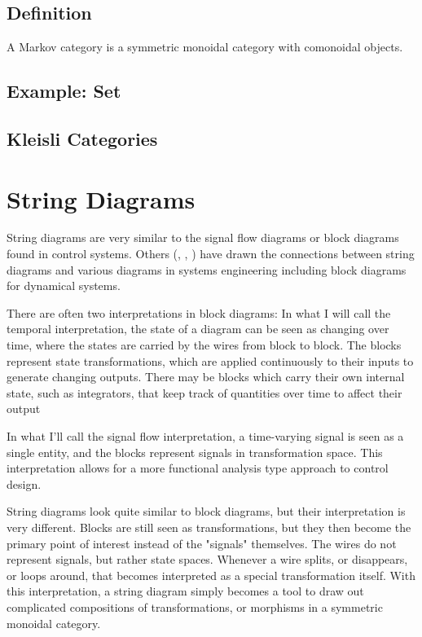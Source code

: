 \subsection{Definition}

A Markov category is a symmetric monoidal category with comonoidal objects.

\subsection{Example: Set}
\subsection{Kleisli Categories}

\section{String Diagrams}

String diagrams are very similar to the signal flow diagrams or block diagrams found in control systems.
Others (\cite{baez2015control}, \cite{fong2016thesis}, \cite{fong2016dynamicalsystems}) have drawn the connections between string diagrams and various diagrams in systems engineering including block diagrams for dynamical systems.

There are often two interpretations in block diagrams:
In what I will call the temporal interpretation, the state of a diagram can be seen as changing over time, where the states are carried by the wires from block to block. The blocks represent state transformations, which are applied continuously to their inputs to generate changing outputs.
There may be blocks which carry their own internal state, such as integrators, that keep track of quantities over time to affect their output

In what I'll call the signal flow interpretation, a time-varying signal is seen as a single entity, and the blocks represent signals in transformation space. This interpretation allows for a more functional analysis type approach to control design.

String diagrams look quite similar to block diagrams, but their interpretation is very different.
Blocks are still seen as transformations, but they then become the primary point of interest instead of the "signals" themselves.
The wires do not represent signals, but rather state spaces.
Whenever a wire splits, or disappears, or loops around, that becomes interpreted as a special transformation itself.
With this interpretation, a string diagram simply becomes a tool to draw out complicated compositions of transformations, or morphisms in a symmetric monoidal category.

